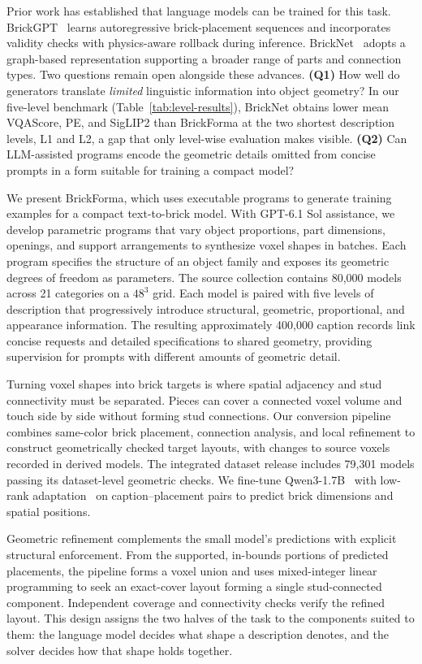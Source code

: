 Prior work has established that language models can be trained for this task. BrickGPT~\cite{brickgpt} learns autoregressive brick-placement sequences and incorporates validity checks with physics-aware rollback during inference. BrickNet~\cite{bricknet} adopts a graph-based representation supporting a broader range of parts and connection types. Two questions remain open alongside these advances. \textbf{(Q1)} How well do generators translate \emph{limited} linguistic information into object geometry? In our five-level benchmark (Table~\ref{tab:level-results}), BrickNet obtains lower mean VQAScore, PE, and SigLIP2 than BrickForma at the two shortest description levels, L1 and L2, a gap that only level-wise evaluation makes visible. \textbf{(Q2)} Can LLM-assisted programs encode the geometric details omitted from concise prompts in a form suitable for training a compact model?

We present BrickForma, which uses executable programs to generate training examples for a compact text-to-brick model. With GPT-6.1 Sol assistance, we develop parametric programs that vary object proportions, part dimensions, openings, and support arrangements to synthesize voxel shapes in batches.
Each program specifies the structure of an object family and exposes its geometric degrees of freedom as parameters. The source collection contains 80,000 models across 21 categories on a $48^3$ grid. Each model is paired with five levels of description that progressively introduce structural, geometric, proportional, and appearance information. The resulting approximately 400,000 caption records link concise requests and detailed specifications to shared geometry, providing supervision for prompts with different amounts of geometric detail.

Turning voxel shapes into brick targets is where spatial adjacency and stud connectivity must be separated. Pieces can cover a connected voxel volume and touch side by side without forming stud connections. Our conversion pipeline combines same-color brick placement, connection analysis, and local refinement to construct geometrically checked target layouts, with changes to source voxels recorded in derived models. The integrated dataset release includes 79,301 models passing its dataset-level geometric checks. We fine-tune Qwen3-1.7B~\cite{qwen3} with low-rank adaptation~\cite{lora} on caption--placement pairs to predict brick dimensions and spatial positions.

Geometric refinement complements the small model's predictions with explicit structural enforcement. From the supported, in-bounds portions of predicted placements, the pipeline forms a voxel union and uses mixed-integer linear programming to seek an exact-cover layout forming a single stud-connected component. Independent coverage and connectivity checks verify the refined layout. This design assigns the two halves of the task to the components suited to them: the language model decides what shape a description denotes, and the solver decides how that shape holds together.

